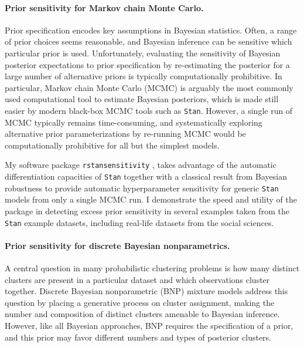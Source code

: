 \paragraph{Prior sensitivity for Markov chain Monte Carlo.}
%
Prior specification encodes key assumptions in Bayesian statistics.  Often, a
range of prior choices seems reasonable, and Bayesian inference can be sensitive
which particular prior is used.  Unfortunately, evaluating the sensitivity of
Bayesian posterior expectations to prior specification by re-estimating the
posterior for a large number of alternative priors is typically computationally
prohibitive. In particular, Markov chain Monte Carlo (MCMC) is arguably the most
commonly used computational tool to estimate Bayesian posteriors, which is made
still easier by modern black-box MCMC tools such as \texttt{Stan}. However, a
single run of MCMC typically remains time-consuming, and systematically
exploring alternative prior parameterizations by re-running MCMC would be
computationally prohibitive for all but the simplest models.

My software package \texttt{rstansensitivity}
\citep{giordano:2020:rstansensitivity, giordano:2018:mcmchyper}, takes advantage
of the automatic differentiation capacities of \texttt{Stan} together with a
classical result from  Bayesian robustness \citep{gustafson:1996:localposterior,
giordano:2018:covariances} to provide automatic hyperparameter sensitivity for
generic \texttt{Stan} models from only a single MCMC run.  I demonstrate the
speed and utility of the package in detecting excess prior sensitivity in
several examples taken from the \texttt{Stan} example datasets,
including real-life datasets from the social sciences.



\paragraph{Prior sensitivity for discrete Bayesian nonparametrics.}
%
A central question in many probabilistic clustering problems is how many
distinct clusters are present in a particular dataset and which observations
cluster together. Discrete Bayesian nonparametric (BNP) mixture models address
this question by placing a generative process on cluster assignment, making the
number and composition of distinct clusters amenable to Bayesian inference.
However, like all Bayesian approaches, BNP requires the specification of a
prior, and this prior may favor different numbers and types of posterior
clusters.

